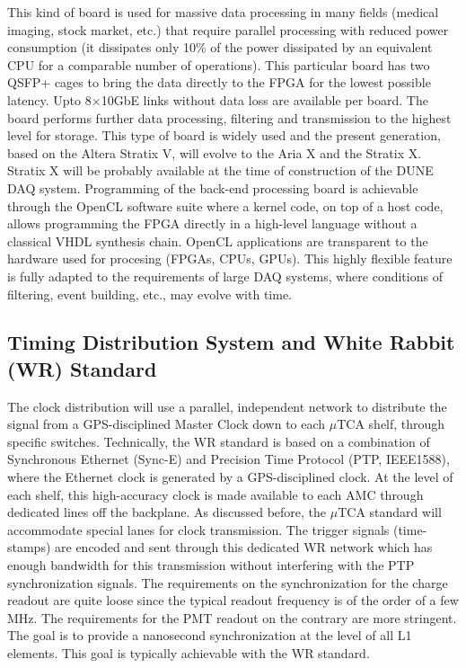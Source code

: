 This kind of board is used for massive data processing in many fields
(medical imaging, stock market, etc.) that require parallel
processing with reduced power consumption (it dissipates only 10\% of the power
dissipated by an equivalent CPU for a comparable number of
operations). This particular board has two QSFP+ cages to bring the
data directly to the FPGA for the lowest possible latency. Upto 8$\times$10GbE
links without data loss are available per board.  The board performs
further data processing, filtering and transmission to the highest
level for storage. This type of board is widely used and the present
generation, based on the Altera Stratix V, will evolve to the Aria X
and the Stratix X. Stratix X will be probably available at the time
of construction of the DUNE DAQ system. Programming of the back-end
processing board is achievable through the OpenCL software suite where
a kernel code, on top of a host code, allows programming  the FPGA directly in a
high-level language without a classical VHDL synthesis
chain. OpenCL applications are transparent to the hardware used for
procesing (FPGAs, CPUs, GPUs). This highly flexible feature is fully
adapted to the requirements of large DAQ systems, where conditions
of filtering, event building, etc., may evolve with time.
 
\subsection{Timing Distribution System and White Rabbit (WR) Standard}

The clock distribution will use a parallel, independent
network to distribute the signal from a GPS-disciplined Master Clock down to each $\mu$TCA
shelf, through specific switches. Technically, the WR standard is based
on a combination of Synchronous Ethernet (Sync-E) and Precision Time
Protocol (PTP, IEEE1588), where the Ethernet clock is generated by a
GPS-disciplined clock. At the level of each shelf, this high-accuracy
clock is made available to each AMC through dedicated lines off
the backplane. As discussed before, the $\mu$TCA standard will accommodate
special lanes for clock transmission. The trigger signals
(time-stamps) are encoded and sent through this dedicated WR network
which has enough bandwidth for this transmission without interfering
with the PTP synchronization signals. The requirements on the
synchronization for the charge readout are quite loose since the
typical readout frequency is of the order of a few MHz. The
requirements for the PMT readout on the contrary are more
stringent. The goal is to provide a nanosecond synchronization at the
level of all L1 elements. This goal is typically achievable with the
WR standard\cite{WR-standard}.

